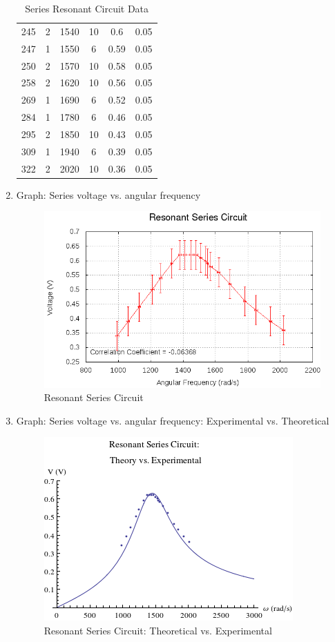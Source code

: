 \begin{enumerate}[resume]
\begin{table}[h]
\begin{tabular}{|c|c|c|c|c|c|}
245 & 2 & 1540 & 10 & 0.6  & 0.05\\
247 & 1 & 1550 & 6  & 0.59 & 0.05\\
250 & 2 & 1570 & 10 & 0.58 & 0.05\\
258 & 2 & 1620 & 10 & 0.56 & 0.05\\
269 & 1 & 1690 & 6  & 0.52 & 0.05\\
284 & 1 & 1780 & 6  & 0.46 & 0.05\\
295 & 2 & 1850 & 10 & 0.43 & 0.05\\
309 & 1 & 1940 & 6  & 0.39 & 0.05\\
322 & 2 & 2020 & 10 & 0.36 & 0.05\\
\hline
\end{tabular}
\label{tbl:RLCSeries}
\caption{Series Resonant Circuit Data}
\end{table}

\item Graph: Series voltage vs. angular frequency
  \begin{figure}[h!]
    \includegraphics{RLC-Resonant-Circuits-Series-Graph.png}
    \caption{Resonant Series Circuit}
    \label{pic:RLCseries}
  \end{figure}
\item Graph: Series voltage vs. angular frequency: Experimental vs. Theoretical
  \begin{figure}[h!]
    \center
    \includegraphics{RLC-Resonant-Circuits-Series-Graph-Mathematica.png}
    \caption{Resonant Series Circuit: Theoretical vs. Experimental}
    \label{pic:RLCseriesMathematica}
  \end{figure}


\end{enumerate}
